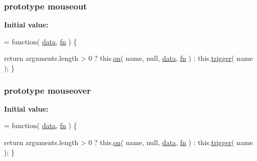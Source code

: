 \subsubsection[{mouseout}]{ {\bf prototype} mouseout}\label{jquery-1_810_82-vsdoc_8js_ac1acec291cac53826354688148db3718}
{\bfseries Initial value\+:}
\begin{DoxyCode}
= \textcolor{keyword}{function}( \hyperlink{jquery-1_810_82-vsdoc_8js_a609407b3456fdc3c5671a9fc4a226ff7}{data}, \hyperlink{jquery-1_810_82-vsdoc_8js_acef6bdaf6b9b20fdcca1ea86f0902c3b}{fn} ) \{


        \textcolor{keywordflow}{return} arguments.length > 0 ?
            this.\hyperlink{jquery-1_810_82-vsdoc_8js_ae453b412b883f60220d73468ef6c6dbc}{on}( name, null, \hyperlink{jquery-1_810_82-vsdoc_8js_a609407b3456fdc3c5671a9fc4a226ff7}{data}, \hyperlink{jquery-1_810_82-vsdoc_8js_acef6bdaf6b9b20fdcca1ea86f0902c3b}{fn} ) :
            this.\hyperlink{jquery-1_810_82-vsdoc_8js_a2388c4114d5e3e4eab020f973641519c}{trigger}( name );
    \}
\end{DoxyCode}
\hypertarget{jquery-1_810_82-vsdoc_8js_a6a0eb7aad006e81b9a2c40c51f12f04e}{}
\subsubsection[{mouseover}]{ {\bf prototype} mouseover}\label{jquery-1_810_82-vsdoc_8js_a6a0eb7aad006e81b9a2c40c51f12f04e}
{\bfseries Initial value\+:}
\begin{DoxyCode}
= \textcolor{keyword}{function}( \hyperlink{jquery-1_810_82-vsdoc_8js_a609407b3456fdc3c5671a9fc4a226ff7}{data}, \hyperlink{jquery-1_810_82-vsdoc_8js_acef6bdaf6b9b20fdcca1ea86f0902c3b}{fn} ) \{


        \textcolor{keywordflow}{return} arguments.length > 0 ?
            this.\hyperlink{jquery-1_810_82-vsdoc_8js_ae453b412b883f60220d73468ef6c6dbc}{on}( name, null, \hyperlink{jquery-1_810_82-vsdoc_8js_a609407b3456fdc3c5671a9fc4a226ff7}{data}, \hyperlink{jquery-1_810_82-vsdoc_8js_acef6bdaf6b9b20fdcca1ea86f0902c3b}{fn} ) :
            this.\hyperlink{jquery-1_810_82-vsdoc_8js_a2388c4114d5e3e4eab020f973641519c}{trigger}( name );
    \}
\end{DoxyCode}
\hypertarget{jquery-1_810_82-vsdoc_8js_adb45f5bdff2560ba1f3ca44f5332221a}{}
